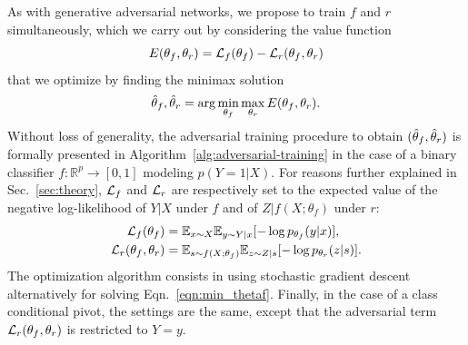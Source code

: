 \documentclass{article}
\theoremstyle{plain}
\begin{document}

As with generative adversarial networks, we propose to
train $f$ and $r$ simultaneously, which we carry out by considering
the value function
\begin{equation}
    E(\theta_f, \theta_r) = {\cal L}_f(\theta_f) - {\cal L}_r(\theta_f, \theta_r)
\end{equation}
that we optimize by finding the minimax solution
\begin{equation}\label{eqn:min_thetaf}
    \smash{\hat\theta_f, \hat\theta_r} = \arg \min_{\theta_f} \max_{\theta_r} E(\theta_f, \theta_r).
\end{equation}
Without loss of generality, the adversarial training procedure to obtain
$(\smash{\hat\theta_f}, \smash{\hat\theta_r})$ is formally presented in
Algorithm~\ref{alg:adversarial-training} in the case of a binary classifier $f :
\mathbb{R}^p \to [0,1]$ modeling $p(Y=1|X)$. For reasons further explained
in Sec.~\ref{sec:theory}, ${\cal L}_f$ and ${\cal L}_r$  are respectively set to the
expected value of the
negative log-likelihood of $Y|X$ under $f$ and of $Z|f(X;\theta_f)$ under
$r$:
\begin{align}
    {\cal L}_f(\theta_f) &= \mathbb{E}_{x \sim X}  \mathbb{E}_{y \sim Y|x} [ -\log p_{\theta_f} (y|x) ], \\
    {\cal L}_r(\theta_f, \theta_r) &= \mathbb{E}_{s \sim f(X;\theta_f)}  \mathbb{E}_{z \sim Z|s} [-\log p_{\theta_r} (z|s)].
\end{align}
The optimization algorithm consists in using stochastic gradient descent
alternatively for solving Eqn.~\ref{eqn:min_thetaf}.
Finally, in the case of a class conditional pivot, the settings are the
same, except that the adversarial term ${\cal L}_r(\theta_f, \theta_r)$ is restricted to $Y=y$.
\end{document}
